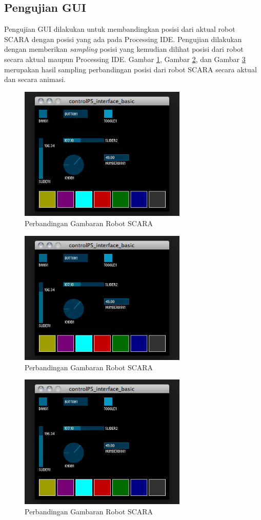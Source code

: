  \subsection{Pengujian GUI}
 Pengujian GUI dilakukan untuk membandingkan posisi dari aktual robot SCARA dengan posisi yang ada pada Processing IDE. Pengujian dilakukan dengan memberikan \textit{sampling} posisi yang kemudian dilihat posisi dari robot secara aktual maupun Processing IDE. Gambar \ref{pic.pengujiangui1}, Gambar \ref{pic.pengujiangui2}, dan Gambar \ref{pic.pengujiangui3} merupakan hasil sampling perbandingan posisi dari robot SCARA secara aktual dan secara animasi.
  \begin{figure}[H]
 	\centering
 	\includegraphics[width=8cm]{gambar/controlp5.jpg}
 	\caption{Perbandingan Gambaran Robot SCARA}
 	\label{pic.pengujiangui1}
 \end{figure}
\begin{figure}[H]
	\centering
	\includegraphics[width=8cm]{gambar/controlp5.jpg}
	\caption{Perbandingan Gambaran Robot SCARA}
	\label{pic.pengujiangui2}
\end{figure}
\begin{figure}[H]
	\centering
	\includegraphics[width=8cm]{gambar/controlp5.jpg}
	\caption{Perbandingan Gambaran Robot SCARA}
	\label{pic.pengujiangui3}
\end{figure}
